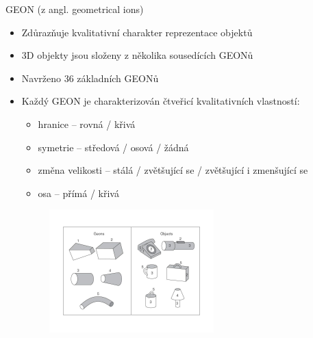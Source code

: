 \begin{frame}
GEON (z angl. geometrical ions)
\begin{itemize}
	\item  Zdůrazňuje  kvalitativní  charakter  reprezentace  objektů
	\item  3D objekty  jsou  složeny  z několika  sousedících GEONů
	\item Navrženo 36 základních GEONů
	\item Každý GEON je charakterizován čtveřicí kvalitativních vlastností:
	    \begin{itemize}
	    \item hranice – rovná / křivá 
	    \item symetrie – středová / osová / žádná 
	    \item změna velikosti – stálá / zvětšující se / zvětšující i zmenšující se 
	    \item osa – přímá / křivá
	    \end{itemize}
	\begin{figure}[!ht]
	\centering
	\includegraphics[width = 0.6\textwidth]{./geons}
	\end{figure}
\end{itemize}
\end{frame}






\subsection{}



